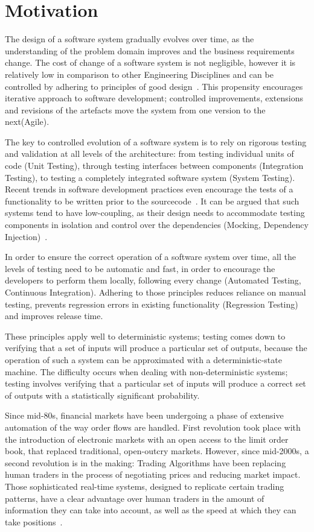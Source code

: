\section{Motivation}

The design of a software system gradually evolves over time, as the understanding of the problem domain improves and the business requirements change. The cost of change of a software system is not negligible, however it is relatively low in comparison to other Engineering Disciplines and can be controlled by adhering to principles of good design~\cite{Gof1995}. This propensity encourages iterative approach to software development; controlled improvements, extensions and revisions of the artefacts move the system from one version to the next(Agile). 

The key to controlled evolution of a software system is to rely on rigorous testing and validation at all levels of the architecture: from testing individual units of code (Unit Testing), through testing interfaces between components (Integration Testing), to testing a completely integrated software system (System Testing). Recent trends in software development practices even encourage the tests of a functionality to be written prior to the sourcecode~\cite{Beck2001}. It can be argued that such systems tend to have low-coupling, as their design needs to accommodate testing components in isolation and control over the dependencies (Mocking, Dependency Injection)~\cite{Myers2004}.

In order to ensure the correct operation of a software system over time, all the levels of testing need to be automatic and fast, in order to encourage the developers to perform them locally, following every change (Automated Testing, Continuous Integration). Adhering to those principles reduces reliance on manual testing, prevents regression errors in existing functionality (Regression Testing) and improves release time.

These principles apply well to deterministic systems; testing comes down to verifying that a set of inputs will produce a particular set of outputs, because the operation of such a system can be approximated with a deterministic-state machine. The difficulty occurs when dealing with non-deterministic systems; testing involves verifying that a particular set of inputs will produce a correct set of outputs with a statistically significant probability.

Since mid-80s, financial markets have been undergoing a phase of extensive automation of the way order flows are handled. First revolution took place with the introduction of electronic markets with an open access to the limit order book, that replaced traditional, open-outcry markets. However, since mid-2000s, a second revolution is in the making: Trading Algorithms have been replacing human traders in the process of negotiating prices and reducing market impact. Those sophisticated real-time systems, designed to replicate certain trading patterns, have a clear advantage over human traders in the amount of information they can take into account, as well as the speed at which they can take positions~\cite{Lenglet}.

